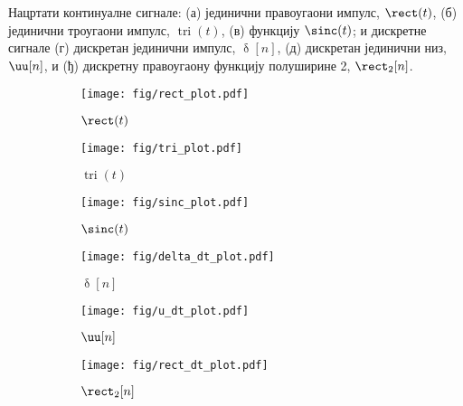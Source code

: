 \PID Нацртати континуалне сигнале:
(а) јединични правоугаони импулс, $\rect(t)$, 
(б) јединични троугаони импулс, $\operatorname{tri}(t)$, 
(в) функцију $\sinc(t)$; и дискретне сигнале 
(г) дискретан јединични импулс, $\updelta[n]$, 
(д) дискретан јединични низ, $\uu[n]$, и 
(ђ) дискретну правоугаону функцију полуширине 2, $\rect_2[n]$.
\\[2mm]

\REZULTAT 
\begin{figure}[ht!]
    \hspace*{0pt}\hfill
    \begin{subfigure}[c]{0.33\textwidth}
        \centering
        \texttt{[image: fig/rect\_plot.pdf]}
        \caption{$\rect(t)$}
    \end{subfigure}
    \hspace*{0pt}\hfill
    \begin{subfigure}[c]{0.3\textwidth}
        \centering
        \texttt{[image: fig/tri\_plot.pdf]}
        \caption{$\operatorname{tri}(t)$}
    \end{subfigure}
    \hfill
    \hspace*{0pt}
    \hspace*{0pt}\hfill
    \begin{subfigure}[c]{0.3\textwidth}
        \centering
        \texttt{[image: fig/sinc\_plot.pdf]}
        \caption{$\sinc(t)$}
    \end{subfigure}
    \hspace*{0pt}\hfill
    \begin{subfigure}[c]{0.3\textwidth}
        \centering
        \texttt{[image: fig/delta\_dt\_plot.pdf]}
        \caption{$\updelta[n]$}
    \end{subfigure}
    \hfill
    \begin{subfigure}[c]{0.3\textwidth}
        \centering
        \texttt{[image: fig/u\_dt\_plot.pdf]}
        \caption{$\uu[n]$}
    \end{subfigure}
    \hfill
    \begin{subfigure}[c]{0.3\textwidth}
        \centering
        \texttt{[image: fig/rect\_dt\_plot.pdf]}
        \caption{$\rect_2[n]$}
    \end{subfigure}
    \hfill
    \hspace*{0pt}
    \caption{}
\end{figure}
\vspace*{-10mm}